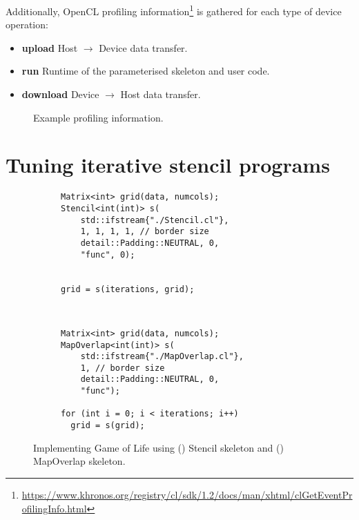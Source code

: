 \noindent
Additionally, OpenCL profiling
information\footnote{\url{https://www.khronos.org/registry/cl/sdk/1.2/docs/man/xhtml/clGetEventProfilingInfo.html}}
is gathered for each type of device operation:

\begin{itemize}
\item \textbf{upload} Host $\rightarrow$ Device data transfer.
\item \textbf{run} Runtime of the parameterised skeleton and user
  code.
\item \textbf{download} Device $\rightarrow$ Host data transfer.
\end{itemize}



\begin{figure}
\centering

\caption{%
Example profiling information.%
}
\label{fig:events}
\end{figure}

\section{Tuning iterative stencil programs}

\begin{figure}
\begin{subfigure}[t]{0.45\textwidth}
\centering
\lstset{language=C++}
\begin{lstlisting}
Matrix<int> grid(data, numcols);
Stencil<int(int)> s(
    std::ifstream{"./Stencil.cl"},
    1, 1, 1, 1, // border size
    detail::Padding::NEUTRAL, 0,
    "func", 0);


grid = s(iterations, grid);
\end{lstlisting}
\caption{}
\label{lst:gol-stencil}
\end{subfigure}
~\hspace{1.5em}
\begin{subfigure}[t]{0.45\textwidth}
\centering
\lstset{language=C++}
\begin{lstlisting}
Matrix<int> grid(data, numcols);
MapOverlap<int(int)> s(
    std::ifstream{"./MapOverlap.cl"},
    1, // border size
    detail::Padding::NEUTRAL, 0,
    "func");

for (int i = 0; i < iterations; i++)
  grid = s(grid);
\end{lstlisting}
\caption{}
\label{lst:gol-mo}
\end{subfigure}
\caption{%
  Implementing Game of Life using () Stencil
  skeleton and () MapOverlap skeleton.%
}
\end{figure}


